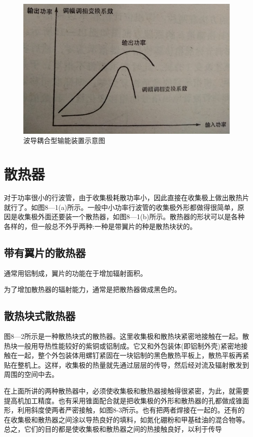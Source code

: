 \begin{figure}[phtb]
	\centering
	\includegraphics[width=0.75\linewidth]{figure/ch11-13}
	\caption{ 波导耦合型输能装置示意图}
	\label{ch11-13}
\end{figure}

\section{散热器}
对于功率很小的行波管，由于收集极耗散功率小，因此直接在收集极上做出散热片就行了。如图8—1(a)所示。一般中小功率行波管的收集极外形都做得很简单，原因是收集极外面还要装一个散热器，如图8—1(b)所示。散热器的形状可以是各种各样的，但一般总不外乎两种:一种是带翼片的种是散热块状的。


\subsection{带有翼片的散热器}


通常用铝制成，翼片的功能在于增加辐射面积。


为了增加散热器的辐射能力，通常是把散热器做成黑色的。
\subsection{散热块式散热器}

图8—2所示是一种散热块式的散热器。这里收集极和散热块紧密地接触在一起。散热块一般用导热性能较好的紫铜或铝制成。它又和外包装体(即铝制外壳)紧密地接触在一起，整个外包装体用螺钉紧固在一块铝制的黑色散热平板上，散热平板再紧贴在整机上。这样，收集极的热量就先通过层层的传导，然后经对流及辐射散发到周围的空间中去。


在上面所讲的两种散热器中，必须使收集极和散热器接触得很紧密，为此，就需要提高机加工精度。也有采用锥面配合就是把收集极的外形和散热器的孔都做成锥面形，利用斜度使两者严密接触，如图8-3所示。也有把两者焊接在一起的。还有的在收集极和散热器之间涂以导热良好的填料，如氮化硼粉和甲基硅油的混合物等。总之，它们的目的都是使收集极和散热器之间的热接触良好，以利于传导


